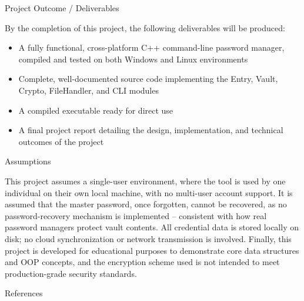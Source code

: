\documentclass[11pt,a4paper]{article}
\newcommand{\blueheading}[1]{%
    {\sffamily\color{TitleBlue}\fontsize{15}{18}\selectfont #1}%
}
\newcommand{\answerbox}[2][]{%
    \vspace{2pt}
    \begin{framed}
    #2
    \end{framed}
}
\begin{document}
\vspace{12mm}

\blueheading{Project Outcome / Deliverables}

\vspace{1mm}


\answerbox{By the completion of this project, the following deliverables will be produced:
\begin{itemize}[leftmargin=5mm, itemsep=0pt, topsep=2pt]
\item A fully functional, cross-platform C++ command-line password manager, compiled and tested on both Windows and Linux environments
\item Complete, well-documented source code implementing the Entry, Vault, Crypto, FileHandler, and CLI modules
\item A compiled executable ready for direct use
\item A final project report detailing the design, implementation, and technical outcomes of the project
\end{itemize}}

\vspace{12mm}

\blueheading{Assumptions}

\vspace{1mm}



\answerbox{This project assumes a single-user environment, where the tool is used by one individual on their own local machine, with no multi-user account support. It is assumed that the master password, once forgotten, cannot be recovered, as no password-recovery mechanism is implemented -- consistent with how real password managers protect vault contents. All credential data is stored locally on disk; no cloud synchronization or network transmission is involved. Finally, this project is developed for educational purposes to demonstrate core data structures and OOP concepts, and the encryption scheme used is not intended to meet production-grade security standards.}

\vspace{50mm}

\blueheading{References}

\vspace{1mm}
\end{document}
